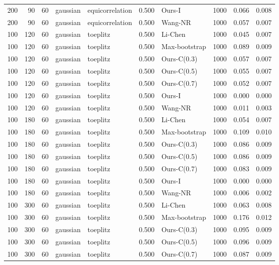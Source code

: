 \begin{tabular}{rrrllrlrrr}
200 & 90 & 60 & gaussian & equicorrelation & 0.500 & Ours-I & 1000 & 0.066 & 0.008 \\
200 & 90 & 60 & gaussian & equicorrelation & 0.500 & Wang-NR & 1000 & 0.057 & 0.007 \\
100 & 120 & 60 & gaussian & toeplitz & 0.500 & Li-Chen & 1000 & 0.045 & 0.007 \\
100 & 120 & 60 & gaussian & toeplitz & 0.500 & Max-bootstrap & 1000 & 0.089 & 0.009 \\
100 & 120 & 60 & gaussian & toeplitz & 0.500 & Ours-C(0.3) & 1000 & 0.057 & 0.007 \\
100 & 120 & 60 & gaussian & toeplitz & 0.500 & Ours-C(0.5) & 1000 & 0.055 & 0.007 \\
100 & 120 & 60 & gaussian & toeplitz & 0.500 & Ours-C(0.7) & 1000 & 0.052 & 0.007 \\
100 & 120 & 60 & gaussian & toeplitz & 0.500 & Ours-I & 1000 & 0.000 & 0.000 \\
100 & 120 & 60 & gaussian & toeplitz & 0.500 & Wang-NR & 1000 & 0.011 & 0.003 \\
100 & 180 & 60 & gaussian & toeplitz & 0.500 & Li-Chen & 1000 & 0.054 & 0.007 \\
100 & 180 & 60 & gaussian & toeplitz & 0.500 & Max-bootstrap & 1000 & 0.109 & 0.010 \\
100 & 180 & 60 & gaussian & toeplitz & 0.500 & Ours-C(0.3) & 1000 & 0.086 & 0.009 \\
100 & 180 & 60 & gaussian & toeplitz & 0.500 & Ours-C(0.5) & 1000 & 0.086 & 0.009 \\
100 & 180 & 60 & gaussian & toeplitz & 0.500 & Ours-C(0.7) & 1000 & 0.083 & 0.009 \\
100 & 180 & 60 & gaussian & toeplitz & 0.500 & Ours-I & 1000 & 0.000 & 0.000 \\
100 & 180 & 60 & gaussian & toeplitz & 0.500 & Wang-NR & 1000 & 0.006 & 0.002 \\
100 & 300 & 60 & gaussian & toeplitz & 0.500 & Li-Chen & 1000 & 0.063 & 0.008 \\
100 & 300 & 60 & gaussian & toeplitz & 0.500 & Max-bootstrap & 1000 & 0.176 & 0.012 \\
100 & 300 & 60 & gaussian & toeplitz & 0.500 & Ours-C(0.3) & 1000 & 0.095 & 0.009 \\
100 & 300 & 60 & gaussian & toeplitz & 0.500 & Ours-C(0.5) & 1000 & 0.096 & 0.009 \\
100 & 300 & 60 & gaussian & toeplitz & 0.500 & Ours-C(0.7) & 1000 & 0.087 & 0.009 \\

\end{tabular}
